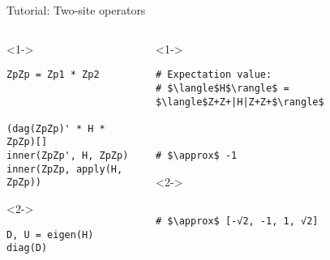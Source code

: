 \begin{frame}[fragile]{Tutorial: Two-site operators}


\begin{columns}

\begin{column}{5cm}

\begin{onlyenv}<1->

\begin{lstlisting}[language=JuliaLocal, style=julia, basicstyle=\small]
ZpZp = Zp1 * Zp2



(dag(ZpZp)' * H * ZpZp)[]
inner(ZpZp', H, ZpZp)
inner(ZpZp, apply(H, ZpZp))
\end{lstlisting}

\end{onlyenv}

\begin{onlyenv}<2->

\begin{lstlisting}[language=JuliaLocal, style=julia, basicstyle=\small]
D, U = eigen(H)
diag(D)
\end{lstlisting}

\end{onlyenv}

\end{column}

\begin{column}{5cm}

\begin{onlyenv}<1->

\begin{lstlisting}[style=julia, numbers=none, mathescape, basicstyle=\small]
# Expectation value:
# $\langle$H$\rangle$ = $\langle$Z+Z+|H|Z+Z+$\rangle$



# $\approx$ -1
 \end{lstlisting}

\end{onlyenv}

\begin{onlyenv}<2->

\begin{lstlisting}[style=julia, numbers=none, mathescape, basicstyle=\small]

# $\approx$ [-√2, -1, 1, √2]
\end{lstlisting}

\end{onlyenv}

\end{column}

\end{columns}

\end{frame}
